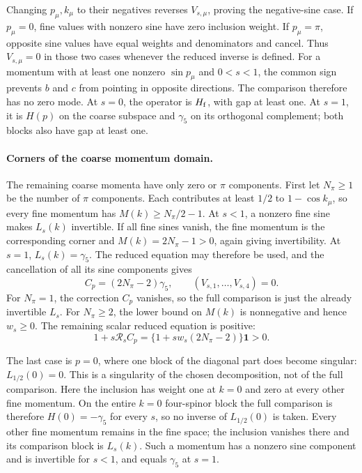 \documentclass[11pt,a4paper]{article}
\theoremstyle{remark}
\newcommand{\Id}{\mathbf 1}
\begin{document}
Changing $p_\mu,k_\mu$ to their negatives reverses
$V_{s,\mu}$, proving the negative-sine case. If $p_\mu=0$,
fine values with nonzero sine have zero inclusion weight. If
$p_\mu=\pi$, opposite sine values have equal weights and
denominators and cancel. Thus $V_{s,\mu}=0$ in those two cases whenever the reduced
inverse is defined.
For a momentum with at least one nonzero $\sin p_\mu$ and
$0<s<1$, the common sign prevents $b$ and $c$ from pointing in
opposite directions. The comparison therefore has no zero mode. At $s=0$, the operator
is $H_{\rm f}$, with gap at least one. At $s=1$, it is
$H(p)$ on the coarse subspace and $\gamma_5$ on its orthogonal
complement; both blocks also have gap at least one.

\paragraph{Corners of the coarse momentum domain.}
The remaining coarse momenta have only zero or $\pi$ components.
First let $N_\pi\ge1$ be the number of $\pi$ components.
Each contributes at least $1/2$ to $1-\cos k_\mu$, so every
fine momentum has $M(k)\ge N_\pi/2-1$. At $s<1$, a
nonzero fine sine makes $L_s(k)$ invertible. If all fine sines
vanish, the fine momentum is the corresponding corner and
$M(k)=2N_\pi-1>0$, again giving invertibility. At $s=1$,
$L_s(k)=\gamma_5$. The reduced equation may therefore be used,
and the cancellation of all its sine components gives
\begin{equation}
 C_p=(2N_\pi-2)\gamma_5,\qquad (V_{s,1},\ldots,V_{s,4})=0.
\end{equation}
For $N_\pi=1$, the correction $C_p$ vanishes, so the full
comparison is just the already invertible $L_s$. For
$N_\pi\ge2$, the lower bound on $M(k)$ is nonnegative and
hence $w_s\ge0$. The remaining scalar reduced equation is positive:
\begin{equation}
 1+s\mathcal R_sC_p=\{1+sw_s(2N_\pi-2)\}\Id>0 .
\end{equation}

The last case is $p=0$, where one block of the diagonal part does
become singular:
$L_{1/2}(0)=0$. This is a singularity of the chosen decomposition,
not of the full comparison. Here the inclusion has weight one at
$k=0$ and zero at every other fine momentum. On the entire
$k=0$ four-spinor block the full comparison is therefore
$H(0)=-\gamma_5$ for every $s$, so no inverse of
$L_{1/2}(0)$ is taken. Every other fine momentum remains in the
fine space; the inclusion vanishes there and its comparison block is
$L_s(k)$. Such a momentum has a nonzero sine component and is
invertible for $s<1$, and equals $\gamma_5$ at $s=1$.
\end{document}
